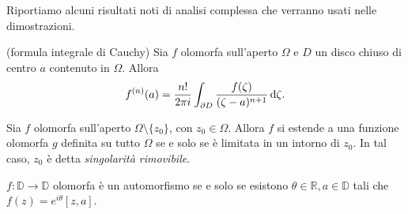 Riportiamo alcuni risultati noti di analisi complessa che verranno usati nelle dimostrazioni.

\begin{thm}
  (formula integrale di Cauchy) Sia $f$ olomorfa sull'aperto $\Omega$ e $D$ un disco chiuso di centro $a$ contenuto in $\Omega$. Allora
  \begin{equation}
    f^{(n)}(a)=\frac{n!}{2\pi i} \int_{\partial D} \frac{f(\zeta)}{(\zeta-a)^{n+1}}\mathop{}\!\mathrm{d}\zeta.
  \end{equation}
\end{thm}

\begin{prop}
  Sia $f$ olomorfa sull'aperto $\Omega \setminus\{z_0\}$, con $z_0 \in \Omega$. Allora $f$ si estende a una funzione olomorfa $g$ definita su tutto $\Omega$ se e solo se è limitata in un intorno di $z_0$. In tal caso, $z_0$ è detta \textit{singolarità rimovibile}.
\end{prop}

\begin{prop} \label{aut}
  $f:\mathbb{D} \longrightarrow \mathbb{D}$ olomorfa è un automorfismo se e solo se esistono $\theta \in \mathbb{R}, a \in \mathbb{D}$ tali che $f(z)=e^{i\theta}[z,a]$.
\end{prop}
